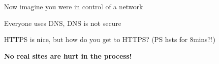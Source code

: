 \documentclass[Screen16to9,17pt,footrule]{foils}
\begin{document}


\begin{list2}
\item Now imagine you were in control of a network
\item Everyone uses DNS, DNS is not secure
\item HTTPS is nice, but how do you get to HTTPS? (PS hsts for 8mins?!)
\end{list2}

\centerline{\Large\bf No real sites are hurt in the process!}

\end{document}
